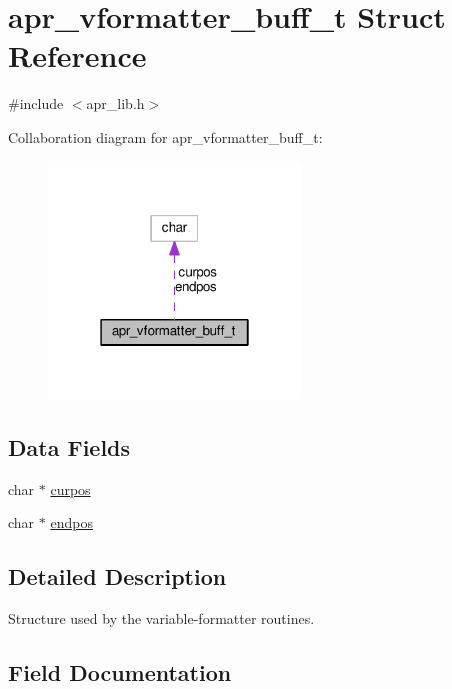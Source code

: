 \hypertarget{structapr__vformatter__buff__t}{}\section{apr\+\_\+vformatter\+\_\+buff\+\_\+t Struct Reference}
\label{structapr__vformatter__buff__t}


{\ttfamily \#include $<$apr\+\_\+lib.\+h$>$}



Collaboration diagram for apr\+\_\+vformatter\+\_\+buff\+\_\+t\+:
\nopagebreak
\begin{figure}[H]
\begin{center}
\leavevmode
\includegraphics[width=190pt]{structapr__vformatter__buff__t__coll__graph}
\end{center}
\end{figure}
\subsection*{Data Fields}
\begin{DoxyCompactItemize}
\item 
char $\ast$ \hyperlink{structapr__vformatter__buff__t_aad69bb2ce382b39f55df6cc59039aee9}{curpos}
\item 
char $\ast$ \hyperlink{structapr__vformatter__buff__t_ab4884e759f4285c72df93e0d63022675}{endpos}
\end{DoxyCompactItemize}


\subsection{Detailed Description}
Structure used by the variable-\/formatter routines. 

\subsection{Field Documentation}
